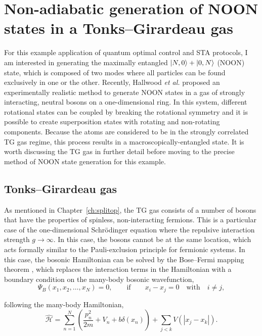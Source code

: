 \section{Non-adiabatic generation of NOON states in a Tonks--Girardeau gas}

For this example application of quantum optimal control and STA protocols, I am interested in generating the maximally entangled $\ket{N,0} + \ket{0,N}$ (NOON) state, which is composed of two modes where all particles can be found exclusively in one or the other.
Recently, Hallwood \textit{et al.} proposed an experimentally realistic method to generate NOON states in a gas of strongly interacting, neutral bosons on a one-dimensional ring.
In this system, different rotational states can be coupled by breaking the rotational symmetry and it is possible to create superposition states with rotating and non-rotating components.
Because the atoms are considered to be in the strongly correlated TG gas regime, this process results in a macroscopically-entangled state.
It is worth discussing the TG gas in further detail before moving to the precise method of NOON state generation for this example.

\subsection{Tonks--Girardeau gas}

As mentioned in Chapter~\ref{ch:splitop}, the TG gas consists of a number of bosons that have the properties of spinless, non-interacting fermions.
This is a particular case of the one-dimensional Schr\"odinger equation where the repulsive interaction strength $g\rightarrow\infty$.
In this case, the bosons cannot be at the same location, which acts formally similar to the Pauli-exclusion principle for fermionic systems.
In this case, the bosonic Hamiltonian can be solved by the Bose--Fermi mapping theorem \cite{girardeau2001ground, girardeau2001measurement}, which replaces the interaction terms in the Hamiltonian with a boundary condition on the many-body bosonic wavefunction,
\begin{equation}
\Psi_B(x_1, x_2, \ldots, x_N) = 0,\qquad \mathrm{if}\qquad x_i - x_j = 0 \quad\textrm{with}\quad i \ne j,
\end{equation}

\noindent following the many-body Hamiltonian,
\begin{equation}
\mathcal{\hat H} = \sum_{n=1}^N\left(\frac{p_n^2}{2m} + V_n + b\delta(x_n)\right) + \sum_{j<k}V(|x_j - x_k|).
\end{equation}


